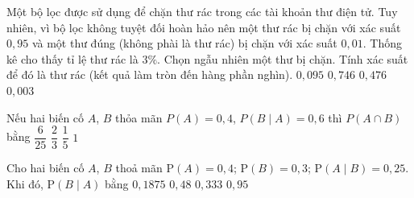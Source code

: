 \begin{ex}%
	Một bộ lọc được sử dụng để chặn thư rác trong các tài khoản thư điện tử. Tuy nhiên, vì bộ lọc không tuyệt đối hoàn hảo nên một thư rác bị chặn với xác suất $0{,}95$ và một thư đúng (không phài là thư rác) bị chặn với xác suất $0{,}01$. Thống kê cho thấy tỉ lệ thư rác là $3\%$. Chọn ngẫu  nhiên một thư bị chặn. Tính xác suất để đó là thư rác (kết quả làm tròn đến hàng phần nghìn).
	 \choice
		{$0{,}095$} 
		{\True  $0{,}746$}
		{$0{,}476$} 
		 {$0{,}003$}
\end{ex}

\begin{ex}%
	Nếu hai biến  cố $A$, $B$ thỏa mãn $P(A)=0{,}4$, $P(B\mid A)=0{,}6$ thì $P(A\cap B)$ bằng
	 \choice
		{\True $\dfrac{6}{25}$} 
		 {$\dfrac{2}{3}$}
		{$\dfrac{1}{5}$} 
		{$1$} 
\end{ex}

\begin{ex}%
	Cho hai biến cố $A$, $B$ thoả mãn $\mathrm{P}(A)=0{,}4$;  $\mathrm{P}(B)=0{,}3$; $\mathrm{P}(A \mid B)=0{,}25$. Khi đó, $\mathrm{P}(B \mid A)$ bằng
	 \choice
		{\True $0{,}1875$} 
		{$0{,}48$} 
		{$0{,}333$} 
		{$0{,}95$} 
\end{ex}

